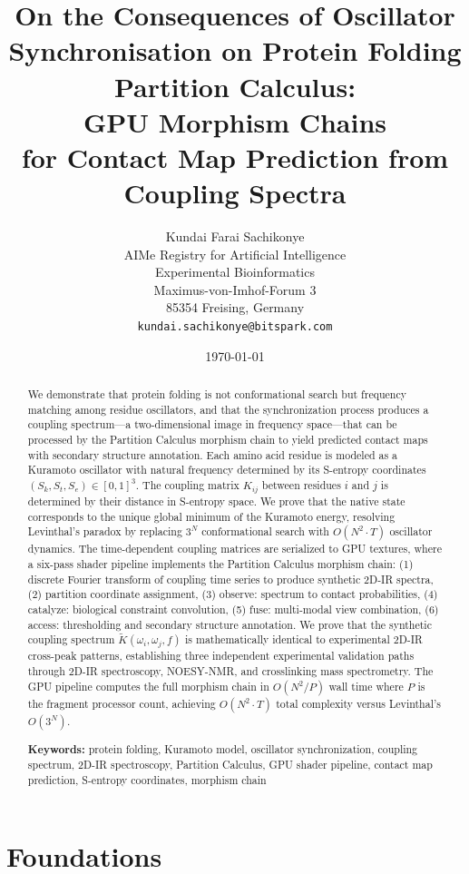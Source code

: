 \documentclass[11pt,twocolumn,a4paper]{article}
\title{On the Consequences of Oscillator Synchronisation on Protein Folding Partition Calculus:\\
\large GPU Morphism Chains\\for Contact Map Prediction from Coupling Spectra}
\author{
Kundai Farai Sachikonye\\
AIMe Registry for Artificial Intelligence\\
Experimental Bioinformatics\\
Maximus-von-Imhof-Forum 3\\
85354 Freising, Germany\\
\texttt{kundai.sachikonye@bitspark.com}
}
\date{\today}
\theoremstyle{definition}
\theoremstyle{remark}
\newcommand{\Sk}{S_k}
\newcommand{\St}{S_t}
\newcommand{\Se}{S_e}
\newcommand{\Ktilde}{\tilde{K}}
\newcommand{\natfreq}{\omega}
\begin{document}
\maketitle

\begin{abstract}
We demonstrate that protein folding is not conformational search but frequency matching among residue oscillators, and that the synchronization process produces a coupling spectrum---a two-dimensional image in frequency space---that can be processed by the Partition Calculus morphism chain to yield predicted contact maps with secondary structure annotation. Each amino acid residue is modeled as a Kuramoto oscillator with natural frequency determined by its S-entropy coordinates $(\Sk, \St, \Se) \in [0,1]^3$. The coupling matrix $K_{ij}$ between residues $i$ and $j$ is determined by their distance in S-entropy space. We prove that the native state corresponds to the unique global minimum of the Kuramoto energy, resolving Levinthal's paradox by replacing $3^N$ conformational search with $O(N^2 \cdot T)$ oscillator dynamics. The time-dependent coupling matrices are serialized to GPU textures, where a six-pass shader pipeline implements the Partition Calculus morphism chain: (1) discrete Fourier transform of coupling time series to produce synthetic 2D-IR spectra, (2) partition coordinate assignment, (3) observe: spectrum to contact probabilities, (4) catalyze: biological constraint convolution, (5) fuse: multi-modal view combination, (6) access: thresholding and secondary structure annotation. We prove that the synthetic coupling spectrum $\Ktilde(\natfreq_i, \natfreq_j, f)$ is mathematically identical to experimental 2D-IR cross-peak patterns, establishing three independent experimental validation paths through 2D-IR spectroscopy, NOESY-NMR, and crosslinking mass spectrometry. The GPU pipeline computes the full morphism chain in $O(N^2/P)$ wall time where $P$ is the fragment processor count, achieving $O(N^2 \cdot T)$ total complexity versus Levinthal's $O(3^N)$.

\medskip
\noindent\textbf{Keywords:} protein folding, Kuramoto model, oscillator synchronization, coupling spectrum, 2D-IR spectroscopy, Partition Calculus, GPU shader pipeline, contact map prediction, S-entropy coordinates, morphism chain
\end{abstract}

\part{Foundations}
\end{document}
